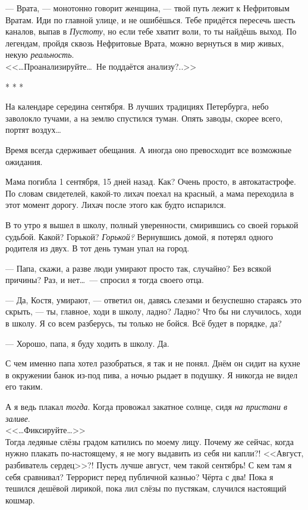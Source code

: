 \documentclass[openany, oneside]{book}
\begin{document}
--- Врата, --- монотонно говорит женщина, --- твой путь лежит к Нефритовым Вратам. Иди по главной улице, и не ошибёшься. Тебе придётся пересечь шесть каналов, выпав в \textit{Пустоту}, но если тебе хватит воли, то ты найдёшь выход. По легендам, пройдя сквозь Нефритовые Врата, можно вернуться в мир живых, некую \textit{реальность}.\\

<<\dots Проанализируйте\dots \ Не поддаётся анализу?..>>

\begin{center}
    * * *
\end{center}

На календаре середина сентября. В лучших традициях Петербурга, небо заволокло тучами, а на землю спустился туман. Опять заводы, скорее всего, портят воздух\dots

Время всегда сдерживает обещания. А иногда оно превосходит все возможные ожидания.

Мама погибла 1 сентября, 15 дней назад. Как? Очень просто, в автокатастрофе. По словам свидетелей, какой-то лихач поехал на красный, а мама переходила в этот момент дорогу. Лихач после этого как будто испарился.

В то утро я вышел в школу, полный уверенности, смирившись со своей горькой судьбой. Какой? Горькой? \textit{Горькой?} Вернувшись домой, я потерял одного родителя из двух. В тот день туман упал на город.

--- Папа, скажи, а разве люди умирают просто так, случайно? Без всякой причины? Раз, и нет\dots \ --- спросил я тогда своего отца.

--- Да, Костя, умирают, --- ответил он, давясь слезами и безуспешно стараясь это скрыть, --- ты, главное, ходи в школу, ладно? Ладно? Что бы ни случилось, ходи в школу. Я со всем разберусь, ты только не бойся. Всё будет в порядке, да?

--- Хорошо, папа, я буду ходить в школу. Да.

С чем именно папа хотел разобраться, я так и не понял. Днём он сидит на кухне в окружении банок из-под пива, а ночью рыдает в подушку. Я никогда не видел его таким.

А я ведь плакал \textit{тогда}. Когда провожал закатное солнце, сидя \textit{на пристани в заливе}.\\

<<\dots Фиксируйте\dots>>\\

Тогда ледяные слёзы градом катились по моему лицу. Почему же сейчас, когда нужно плакать по-настоящему, я не могу выдавить из себя ни капли?! <<Август, разбиватель сердец>>?! Пусть лучше август, чем такой сентябрь! С кем там я себя сравнивал? Террорист перед публичной казнью? Чёрта с два! Пока я тешился дешёвой лирикой, пока лил слёзы по пустякам, случился настоящий кошмар.
\end{document}

